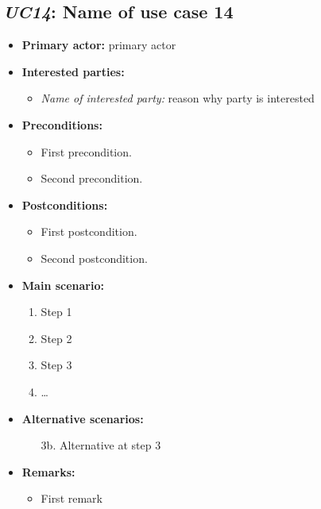 \documentclass[a4paper,10pt]{article}
\begin{document}
\subsection{\emph{UC14}: Name of use case 14}
\begin{itemize}
    \item \textbf{Primary actor:} primary actor
    \item \textbf{Interested parties:} 
        \begin{itemize}
            \item \textit{Name of interested party:} reason why party is interested
        \end{itemize}

    \item \textbf{Preconditions:}
        \begin{itemize}
            \item First precondition.
            \item Second precondition.
        \end{itemize}

    \item \textbf{Postconditions:}
        \begin{itemize}
            \item First postcondition.
            \item Second postcondition.
        \end{itemize}
        
    \item \textbf{Main scenario:} 
    \begin{enumerate}
       \item Step 1
       \item Step 2
       \item Step 3
       \item \ldots
    \end{enumerate}

    \item \textbf{Alternative scenarios:} 
    \begin{enumerate}
        \item [3b.] Alternative at step 3
    \end{enumerate}
    
    \item \textbf{Remarks:}
        \begin{itemize}
            \item First remark
        \end{itemize}
\end{itemize}
\end{document}
